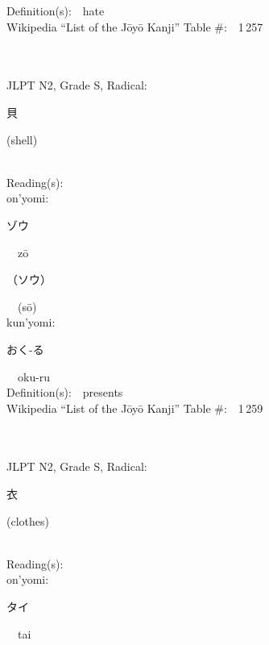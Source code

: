 \begin{multicols}{2}
Definition(s):\ \ hate \\
Wikipedia ``List of the J\=oy\=o Kanji'' Table \#:\ \ 1\,257 \\
\ \ \\
{\fontsize{34pt}{40pt}  }\ \ \\  %
{JLPT N2, Grade S, Radical:\ \ {\begin{CJK}{UTF8}{min} 貝 \end{CJK}} (shell) } \\
Reading(s):\ \ \\
{\hspace*{1em}}on'yomi:\ \ \\
{\hspace*{2em}}{\begin{CJK}{UTF8}{min} ゾウ \end{CJK}}\ \ z\=o\ \ \\
{\hspace*{2em}}{\begin{CJK}{UTF8}{min} （ソウ） \end{CJK}}\ \ (s\=o)\ \ \\
{\hspace*{1em}}kun'yomi:\ \ \\
{\hspace*{2em}}{\begin{CJK}{UTF8}{min} おく-る \end{CJK}}\ \ oku-ru\ \ \\
Definition(s):\ \ presents \\
Wikipedia ``List of the J\=oy\=o Kanji'' Table \#:\ \ 1\,259 \\
\ \ \\
{\fontsize{34pt}{40pt}  }\ \ \\  %
{JLPT N2, Grade S, Radical:\ \ {\begin{CJK}{UTF8}{min} 衣 \end{CJK}} (clothes) } \\
Reading(s):\ \ \\
{\hspace*{1em}}on'yomi:\ \ \\
{\hspace*{2em}}{\begin{CJK}{UTF8}{min} タイ \end{CJK}}\ \ tai\ \ \\

\end{multicols}

